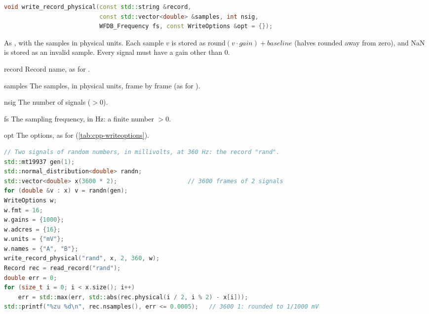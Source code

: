 \begin{lstlisting}[language=C++,style=signature]
void write_record_physical(const std::string &record,
                           const std::vector<double> &samples, int nsig,
                           WFDB_Frequency fs, const WriteOptions &opt = {});
\end{lstlisting}
As , with the samples in physical units. Each sample $v$ is stored as
$\mathrm{round}(v \cdot \mathit{gain}) + \mathit{baseline}$ (halves rounded away from
zero), and NaN is stored as an invalid sample. Every signal must have a gain other than
0.
\begin{params}
\item[record] Record name, as for .
\item[samples] The samples, in physical units, frame by frame (as for
  ).
\item[nsig] The number of signals ($> 0$).
\item[fs] The sampling frequency, in Hz: a finite number $> 0$.
\item[opt] The options, as for  (\cref{tab:cpp-writeoptions}).
\end{params}
\begin{lstlisting}[language=C++,style=example]
// Two signals of random numbers, in millivolts, at 360 Hz: the record "rand".
std::mt19937 gen(1);
std::normal_distribution<double> randn;
std::vector<double> x(3600 * 2);                    // 3600 frames of 2 signals
for (double &v : x) v = randn(gen);
WriteOptions w;
w.fmt = 16;
w.gains = {1000};
w.adcres = {16};
w.units = {"mV"};
w.names = {"A", "B"};
write_record_physical("rand", x, 2, 360, w);
Record rec = read_record("rand");
double err = 0;
for (size_t i = 0; i < x.size(); i++)
    err = std::max(err, std::abs(rec.physical(i / 2, i % 2) - x[i]));
std::printf("%zu %d\n", rec.nsamples(), err <= 0.0005);   // 3600 1: rounded to 1/1000 mV
\end{lstlisting}

